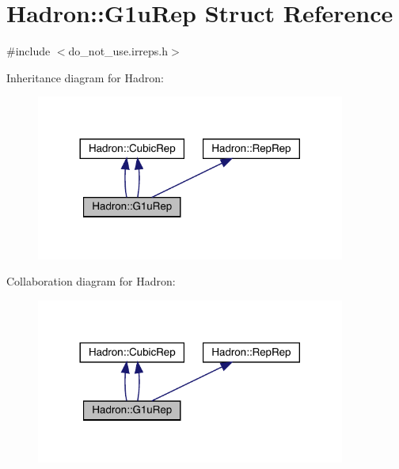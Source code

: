 \hypertarget{structHadron_1_1G1uRep}{}\section{Hadron\+:\+:G1u\+Rep Struct Reference}
\label{structHadron_1_1G1uRep}


{\ttfamily \#include $<$do\+\_\+not\+\_\+use.\+irreps.\+h$>$}



Inheritance diagram for Hadron\+:\nopagebreak
\begin{figure}[H]
\begin{center}
\leavevmode
\includegraphics[width=288pt]{d8/d9e/structHadron_1_1G1uRep__inherit__graph}
\end{center}
\end{figure}


Collaboration diagram for Hadron\+:\nopagebreak
\begin{figure}[H]
\begin{center}
\leavevmode
\includegraphics[width=288pt]{d2/d79/structHadron_1_1G1uRep__coll__graph}
\end{center}
\end{figure}
